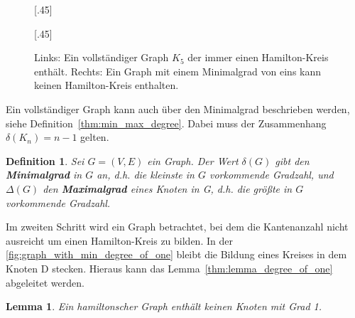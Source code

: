 \documentclass{article}
\newtheorem{mydef}{Definition}
\newtheorem{mylem}{Lemma}
\begin{document}
\begin{figure}[h]
	\centering
	\subcaptionbox{\label{fig:pentagon_graph}}[.45\linewidth]
	{
	}
	\hfill
	\subcaptionbox{\label{fig:graph_with_min_degree_of_one}}[.45\linewidth]
	{
	}
	\caption{Links: Ein vollständiger Graph $K_5$ der immer einen Hamilton-Kreis enthält. Rechts: Ein Graph mit einem Minimalgrad von eins kann keinen Hamilton-Kreis enthalten.}
\end{figure}

Ein vollständiger Graph kann auch über den Minimalgrad beschrieben werden, siehe Definition~\autoref{thm:min_max_degree}. Dabei muss der Zusammenhang $\delta(K_n) = n-1$ gelten.

\begin{mydef}\label{thm:min_max_degree}
	Sei $G=(V,E)$ ein Graph. Der Wert $\delta(G)$ gibt den \textbf{Minimalgrad} in $G$ an, d.h. die kleinste in $G$ vorkommende Gradzahl, und $\Delta(G)$ den \textbf{Maximalgrad} eines Knoten in G, d.h. die größte in $G$ vorkommende Gradzahl. \cite{busing2010graphen}
\end{mydef}

Im zweiten Schritt wird ein Graph betrachtet, bei dem die Kantenanzahl nicht ausreicht um einen Hamilton-Kreis zu bilden. In der \autoref{fig:graph_with_min_degree_of_one} bleibt die Bildung eines Kreises in dem Knoten D stecken. Hieraus kann das Lemma~\autoref{thm:lemma_degree_of_one} abgeleitet werden.

\begin{mylem}\label{thm:lemma_degree_of_one}
	Ein hamiltonscher Graph enthält keinen Knoten mit Grad 1.
\end{mylem}

\end{document}
